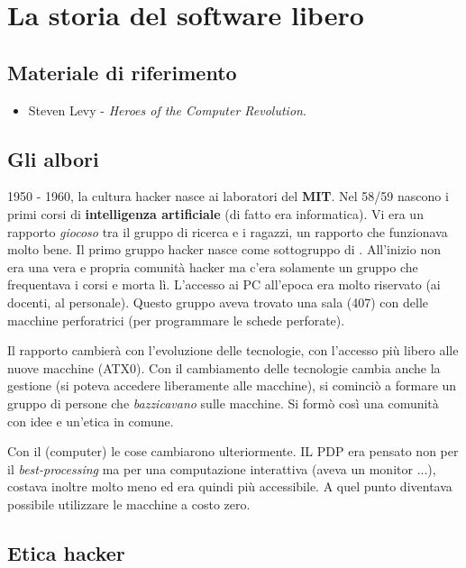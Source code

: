 \section{La storia del software libero}

\subsection*{Materiale di riferimento}

\begin{itemize}

\item Steven Levy - \textit{Heroes of the Computer Revolution}.

\end{itemize}

\subsection{Gli albori}

1950 - 1960, la cultura hacker nasce ai laboratori del \textbf{MIT}. Nel 58/59 nascono i primi corsi di \textbf{intelligenza artificiale} (di fatto era informatica). Vi era un rapporto \textit{giocoso} tra il gruppo di ricerca e i ragazzi, un rapporto che funzionava molto bene. Il primo gruppo hacker nasce come sottogruppo di . All'inizio non era una vera e propria comunità hacker ma c'era solamente un gruppo che frequentava i corsi e morta lì. L'accesso ai PC all'epoca era molto riservato (ai docenti, al personale). Questo gruppo aveva trovato una sala (407) con delle macchine perforatrici (per programmare le schede perforate). 

Il rapporto cambierà con l'evoluzione delle tecnologie, con l'accesso più libero alle nuove macchine (ATX0). Con il cambiamento delle tecnologie cambia anche la gestione (si poteva accedere liberamente alle macchine), si cominciò a formare un gruppo di persone che \textit{bazzicavano} sulle macchine. Si formò così una comunità con idee e un'etica in comune. 

Con il  (computer) le cose cambiarono ulteriormente. IL PDP era pensato non per il \textit{best-processing} ma per una computazione interattiva (aveva un monitor ...), costava inoltre molto meno ed era quindi più accessibile. A quel punto diventava possibile utilizzare le macchine a costo zero.

\subsection{Etica hacker}

